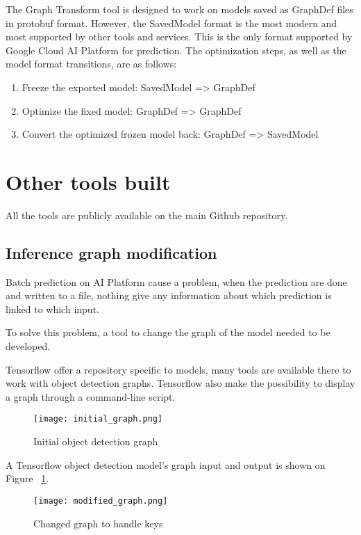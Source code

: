 The Graph Transform tool is designed to work on models saved as GraphDef files in protobuf format. However, the SavedModel format is the most modern and most supported by other tools and services. This is the only format supported by Google Cloud AI Platform for prediction.
The optimization steps, as well as the model format transitions, are as follows:
\begin{enumerate}
    \item Freeze the exported model: SavedModel => GraphDef
    \item Optimize the fixed model: GraphDef => GraphDef
    \item Convert the optimized frozen model back: GraphDef => SavedModel
\end{enumerate}


\pagebreak\section{Other tools built}
All the tools are publicly available on the main Github repository.

\subsection{Inference graph modification}
Batch prediction on AI Platform cause a problem, when the prediction are done and written to a file, nothing give any information about which prediction is linked to which input.

To solve this problem, a tool to change the graph of the model needed to be developed.

Tensorflow offer a repository specific to models\cite{tensorflow_models}, many tools are available there to work with object detection graphs.
Tensorflow also make the possibility to display a graph through a command-line script.


\begin{figure}[H]
  \centering
  \texttt{[image: initial\_graph.png]}
  \caption{Initial object detection graph}
  \label{fig:initialgraph}
\end{figure}

A Tensorflow object detection model's graph input and output is shown on Figure ~\ref{fig:initialgraph}.

\begin{figure}[H]
  \centering
  \texttt{[image: modified\_graph.png]}
  \caption{Changed graph to handle keys}
  \label{fig:changedgraph}
\end{figure}

